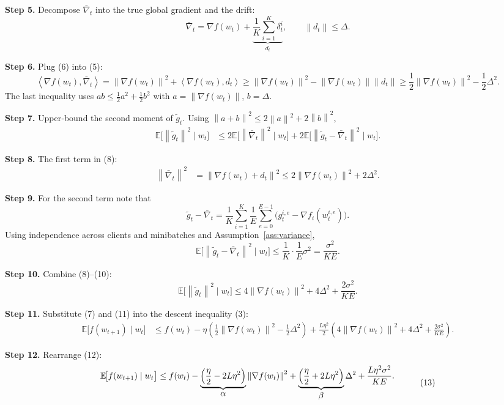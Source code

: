 \documentclass{article}
\newcommand{\E}{\mathbb{E}}
\newcommand{\norm}[1]{\left\lVert#1\right\rVert}
\newcommand{\inner}[2]{\left\langle #1,#2\right\rangle}
\begin{document}
\noindent\textbf{Step 5.}  Decompose $\bar\nabla_t$ into the true global gradient and the drift:
\[
\bar\nabla_t = \nabla f(w_t) + \underbrace{\frac1K\sum_{i=1}^K\delta_{t}^{i}}_{\displaystyle d_t},
\qquad \norm{d_t}\le \Delta .
\tag{6}
\]

\noindent\textbf{Step 6.}  Plug (6) into (5):
\[
\inner{\nabla f(w_t)}{\bar\nabla_t}
= \norm{\nabla f(w_t)}^2 + \inner{\nabla f(w_t)}{d_t}
\ge \norm{\nabla f(w_t)}^2 - \norm{\nabla f(w_t)}\norm{d_t}
\ge \frac12\norm{\nabla f(w_t)}^2 - \frac12\Delta^2 .
\tag{7}
\]
The last inequality uses $ab\le\frac12 a^2+\frac12 b^2$ with $a=\norm{\nabla f(w_t)}$, $b=\Delta$.

\noindent\textbf{Step 7.}  Upper‑bound the second moment of $\tilde g_t$.
Using $\norm{a+b}^2\le 2\norm{a}^2+2\norm{b}^2$,
\[
\begin{aligned}
\E\!\bigl[\norm{\tilde g_t}^2\mid w_t\bigr]
&\le 2\E\!\bigl[\norm{\bar\nabla_t}^2\mid w_t\bigr]
   +2\E\!\bigl[\norm{\tilde g_t-\bar\nabla_t}^2\mid w_t\bigr] .
\end{aligned}
\tag{8}
\]

\noindent\textbf{Step 8.}  The first term in (8):
\[
\begin{aligned}
\norm{\bar\nabla_t}^2
&= \norm{\nabla f(w_t)+d_t}^2
 \le 2\norm{\nabla f(w_t)}^2+2\Delta^2 .
\end{aligned}
\tag{9}
\]

\noindent\textbf{Step 9.}  For the second term note that
\[
\tilde g_t-\bar\nabla_t
= \frac1K\sum_{i=1}^K\frac1E\sum_{e=0}^{E-1}\bigl(g_{t}^{i,e}-\nabla f_i(w_{t}^{i,e})\bigr) .
\]
Using independence across clients and minibatches and Assumption~\ref{ass:variance},
\[
\E\!\bigl[\norm{\tilde g_t-\bar\nabla_t}^2\mid w_t\bigr]
\le \frac{1}{K}\cdot\frac{1}{E}\sigma^2
= \frac{\sigma^2}{KE}.
\tag{10}
\]

\noindent\textbf{Step 10.}  Combine (8)–(10):
\[
\E\!\bigl[\norm{\tilde g_t}^2\mid w_t\bigr]
\le 4\norm{\nabla f(w_t)}^2+4\Delta^2+\frac{2\sigma^2}{KE}.
\tag{11}
\]

\noindent\textbf{Step 11.}  Substitute (7) and (11) into the descent inequality (3):
\[
\begin{aligned}
\E\!\bigl[f(w_{t+1})\mid w_t\bigr]
&\le f(w_t)-\eta\!\left(\frac12\norm{\nabla f(w_t)}^2-\frac12\Delta^2\right)
   +\frac{L\eta^2}{2}\!\left(4\norm{\nabla f(w_t)}^2+4\Delta^2+\frac{2\sigma^2}{KE}\right) .
\end{aligned}
\tag{12}
\]

\noindent\textbf{Step 12.}  Rearrange (12):
\[
\begin{aligned}
\E\!\bigl[f(w_{t+1})\mid w_t\bigr]
&\le f(w_t)
-\underbrace{\Bigl(\frac{\eta}{2}-2L\eta^2\Bigr)}_{\displaystyle \alpha}
   \norm{\nabla f(w_t)}^2
+\underbrace{\Bigl(\frac{\eta}{2}+2L\eta^2\Bigr)}_{\displaystyle \beta}\Delta^2
+\frac{L\eta^2\sigma^2}{K E}.
\end{aligned}
\tag{13}
\]
\end{document}

